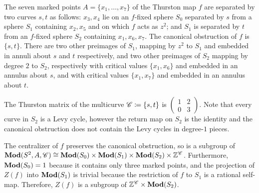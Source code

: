 \documentclass{amsart}
\begin{document}
The seven marked points $A=\{x_1,\dots,x_7\}$ of the Thurston map $f$
are separated by two curves $s,t$ as follows: $x_3,x_4$ lie on an
$f$-fixed sphere $S_0$ separated by $s$ from a sphere $S_1$ containing
$x_2,x_5$ and on which $f$ acts as $z^2$; and $S_1$ is separated by
$t$ from an $f$-fixed sphere $S_2$ containing $x_1,x_6,x_7$. The
canonical obstruction of $f$ is $\{s,t\}$. There are two other
preimages of $S_1$, mapping by $z^2$ to $S_1$ and embedded in annuli
about $s$ and $t$ respectively, and two other preimages of $S_2$
mapping by degree $2$ to $S_2$, respectively with critical values
$\{x_1,x_6\}$ and embedded in an annulus about $s$, and with critical
values $\{x_1,x_7\}$ and embedded in an annulus about $t$.

The Thurston matrix of the multicurve ${\mathscr C}\coloneqq\{s,t\}$ is
$(\begin{smallmatrix}1 & 2\\0 & 3\end{smallmatrix})$. Note that every
curve in $S_2$ is a Levy cycle, however the return map on $S_2$ is the
identity and the canonical obstruction does not contain the Levy
cycles in degree-$1$ pieces.

The centralizer of $f$ preserves the canonical obstruction, so is a
subgroup of
$\mathbf{\relax Mod}(S^2,A,{\mathscr C})\cong \mathbf{\relax Mod}(S_0)\times \mathbf{\relax Mod}(S_1)\times \mathbf{\relax Mod}(S_2)\times
{\mathbb Z}^{{\mathscr C}}$.  Furthermore, $\mathbf{\relax Mod}(S_0)=1$ because it contains only three
marked points, and the projection of $Z(f)$ into $\mathbf{\relax Mod}(S_1)$ is
trivial because the restriction of $f$ to $S_1$ is a rational
self-map. Therefore, $Z(f)$ is a subgroup of ${\mathbb Z}^{\mathscr C}\times\mathbf{\relax Mod}(S_2)$.
\end{document}

